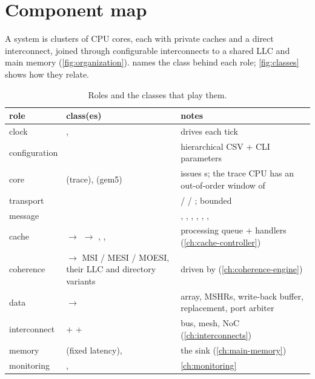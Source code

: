 \section{Component map}


A system is clusters of CPU cores, each with private caches and a direct interconnect, joined
through configurable interconnects to a shared LLC and main memory (\cref{fig:organization}).
 names the class behind each role; \cref{fig:classes} shows how they relate.

\begin{table}[htbp]\centering\small
\caption{Roles and the classes that play them.}\label{tab:roles}
\begin{tabularx}{\textwidth}{@{}l>{\raggedright\arraybackslash}p{}Y@{}}
\toprule role & class(es) & notes \\ \midrule
clock & ,  & drives  each tick \\
configuration &  & hierarchical CSV + CLI parameters \\
core &  (trace),  (gem5) & issues s; the trace CPU has an out-of-order window of  \\
transport &  &  /  / ; bounded \\
message &  & , , , , , ,  \\
cache &  $\rightarrow$  $\rightarrow$ , ,  & processing queue + handlers (\cref{ch:cache-controller}) \\
coherence &  $\rightarrow$ MSI / MESI / MOESI, their LLC and directory variants & driven by  (\cref{ch:coherence-engine}) \\
data &  $\rightarrow$  & array, MSHRs, write-back buffer, replacement, port arbiter \\
interconnect &  +  +  & bus, mesh, NoC (\cref{ch:interconnects}) \\
memory &  (fixed latency),  & the sink (\cref{ch:main-memory}) \\
monitoring & ,  & \cref{ch:monitoring} \\
\bottomrule
\end{tabularx}
\end{table}


